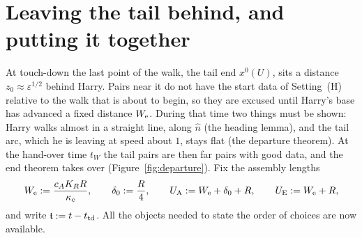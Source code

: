 ﻿%
\section{Leaving the tail behind, and putting it together}\label{sec:assembly}

At touch-down the last point of the walk, the tail end $x^0(U)$, sits a distance $z_0\approx\varepsilon^{1/2}$ behind
Harry. Pairs near it do not have the start data of Setting~(H) relative to the walk that is about to begin, so they are
excused until Harry's base has advanced a fixed distance $W_{\mathrm{e}}$. During that time two things must be shown: Harry walks
almost in a straight line, along $\hat n$ (the heading lemma), and the tail arc, which he is leaving at speed about $1$,
stays flat (the departure theorem). At the hand-over time $t_W$ the tail pairs are then far pairs with good data, and
the end theorem takes over (Figure~\ref{fig:departure}). Fix the assembly lengths
\[
W_{\mathrm{e}}:=\frac{c_AK_RR}{\kappa_c},\qquad \delta_0:=\frac R4,\qquad U_{\mathrm{A}}:=W_{\mathrm{e}}+\delta_0+R,\qquad U_{\mathrm{E}}:=W_{\mathrm{e}}+R ,
\]
and write $\mathfrak{t}:=t-t_{\mathrm{td}}$. All the objects needed to state the order of choices are now available.

